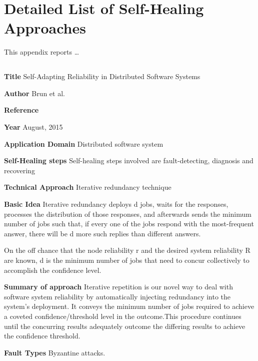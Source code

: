 \appendix
\chapter{Detailed List of Self-Healing Approaches}
\label{ap:approches}

This appendix reports \ldots 

\section{} \label{}
\begin{compactitem}
\item[\textbf{Title}]Self-Adapting Reliability in Distributed Software Systems
\item[\textbf{Author}] 
Brun et al.
\item[\textbf{Reference}] 
\cite{brun_self-adapting_2015}
\item[\textbf{Year}] 
August, 2015
\item[\textbf{Application Domain}] 
Distributed software system
\item[\textbf{Self-Healing steps}] Self-healing steps involved are fault-detecting, diagnosis and recovering
\item[\textbf{Technical Approach}]Iterative redundancy technique
\item[\textbf{Basic Idea}] 
Iterative redundancy deploys d jobs, waits for the responses, processes the distribution of those responses, and afterwards sends the minimum number of jobs such that, if every one of the jobs respond with the most-frequent answer, there will be d more such replies than different answers.

On the off chance that the node reliability r and the desired system reliability R are known, d is the minimum number of jobs that need to concur collectively to accomplish the confidence level.

\item[\textbf{Summary of approach}]
Iterative repetition is our novel way to deal with software system reliability by automatically injecting redundancy into the system's deployment. It conveys the minimum number of jobs required to achieve a coveted confidence/threshold level in the outcome.This procedure continues until the concurring results adequately outcome the differing results to achieve the confidence threshold.

\item[\textbf{Fault Types}]Byzantine attacks.


\end{compactitem}
